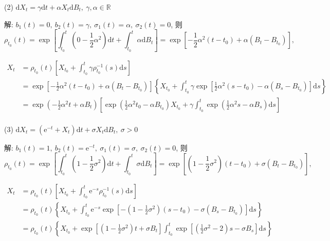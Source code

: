 \documentclass[openany]{ctexbook}
\theoremstyle{kaiti}
\theoremstyle{normal}
\begin{document}
(2) $\mathrm{d}X_t=\gamma\mathrm{d}t+\alpha X_t\mathrm{d}B_t,~\gamma,\alpha\in\mathbb{R}$

解: $b_1(t)=0,~b_2(t)=\gamma,~\sigma_1(t)=\alpha,~\sigma_2(t)=0$, 则
\begin{equation}
  \rho_{t_0}(t)=\exp\left[\int_{t_0}^t\left(0-\frac{1}{2}\alpha^2\right)\mathrm{d}t+\int_{t_0}^t\alpha \mathrm{d}B_t\right]=\exp\left[-\frac{1}{2}\alpha^2(t-t_0)+\alpha (B_t-B_{t_0})\right],
\end{equation}

\begin{equation}
  \begin{aligned}
    X_t
    &=\rho_{t_0}(t)\left[X_{t_0}+\int_{t_0}^t\gamma\rho_{t_0}^{-1}(s)\mathrm{d}s\right]\\
    &=\exp\left[-\frac{1}{2}\alpha^2(t-t_0)+\alpha (B_t-B_{t_0})\right]\left\{X_{t_0}+\int_{t_0}^t\gamma\exp\left[\frac{1}{2}\alpha^2(s-t_0)-\alpha (B_s-B_{t_0})\right]\mathrm{d}s\right\}\\
    &=\exp\left(-\frac{1}{2}\alpha^2t+\alpha B_t\right)\left[\exp\left(\frac{1}{2}\alpha^2t_0-\alpha B_{t_0}\right)X_{t_0}+\gamma\int_{t_0}^t\exp\left(\frac{1}{2}\alpha^2s-\alpha B_s\right)\mathrm{d}s\right]\\
  \end{aligned}
\end{equation}

(3) $\mathrm{d}X_t=(\mathrm{e}^{-t}+X_t)\mathrm{d}t+\sigma X_t\mathrm{d}B_t,~\sigma>0$

解: $b_1(t)=1,~b_2(t)=\mathrm{e}^{-t},~\sigma_1(t)=\sigma,~\sigma_2(t)=0$, 则
\begin{equation}
  \rho_{t_0}(t)=\exp\left[\int_{t_0}^t\left(1-\frac{1}{2}\sigma^2\right)\mathrm{d}t+\int_{t_0}^t\sigma \mathrm{d}B_t\right]=\exp\left[\left(1-\frac{1}{2}\sigma^2\right)(t-t_0)+\sigma (B_t-B_{t_0})\right],
\end{equation}

\begin{equation}
  \begin{aligned}
    X_t
    &=\rho_{t_0}(t)\left[X_{t_0}+\int_{t_0}^t\mathrm{e}^{-s}\rho_{t_0}^{-1}(s)\mathrm{d}s\right]\\
    &=\rho_{t_0}(t)\left\{X_{t_0}+\int_{t_0}^t\mathrm{e}^{-s}\exp\left[-\left(1-\frac{1}{2}\sigma^2\right)(s-t_0)-\sigma (B_s-B_{t_0})\right]\mathrm{d}s\right\}\\
    &=\rho_{t_0}(t)\left\{X_{t_0}+\exp\left[\left(1-\frac{1}{2}\sigma^2\right)t+\sigma B_t\right]\int_{t_0}^t\exp\left[\left(\frac{1}{2}\sigma^2-2\right)s-\sigma B_s\right]\mathrm{d}s\right\}\\
  \end{aligned}
\end{equation}
\end{document}
